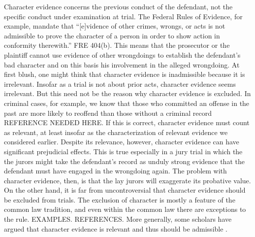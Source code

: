 \documentclass[10pt]{article}
\begin{document}
Character evidence concerns the previous conduct of the defendant, not the specific conduct 
under examination at trial.  The Federal Rules of Evidence, for example, mandate that  ``[e]vidence of other crimes, wrongs, or acts is not admissible to prove 
the character of a person in order to show action in conformity therewith.'' FRE 404(b). This means that the prosecutor or the plaintiff 
cannot use evidence of other wrongdoings to establish the defendant's bad character and on this basis his involvement in the alleged wrongdoing.
At first blush, one might think that character evidence is inadmissible because it is irrelevant. Insofar as a trial is not about prior acts, 
character evidence seems irrelevant. But this need not be the reason why character evidence is excluded. 
In criminal cases, for example, we know that those who committed an offense in the past 
are more likely to reoffend than those without a criminal record REFERENCE NEEDED HERE. If this is correct, 
character evidence must count as relevant, at least insofar as the characterization of relevant evidence we considered earlier. 
Despite its relevance, however, character evidence can have significant prejudicial effects. 
This is true especially in a jury trial in which the the jurors might take 
the defendant's record as unduly strong evidence that the defendant must have engaged in the wrongdoing again. The problem with character evidence, 
then, is that the lay jurors will exaggerate its probative value. 
On the other hand, it is far from uncontroversial that character evidence should be excluded from trials. 
The exclusion of character is mostly a feature of the common law tradition, and even within the common law there are  
exceptions to the rule. EXAMPLES. REFERENCES.
More generally, some scholars have argued that character evidence is relevant and thus should be admissible \citep{redmayne02}.
\end{document}
